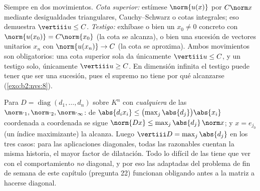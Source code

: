 \begin{method}\label{met:b2:nvs:opnorm}
Siempre en dos movimientos. \emph{Cota superior:} estímese
$\norm{u(x)}$ por $C\norm x$ mediante desigualdades triangulares,
Cauchy--Schwarz o cotas integrales; eso demuestra $\vertiii u \leq
C$. \emph{Testigo:} exhíbase o bien un $x_0 \neq 0$ concreto con
$\norm{u(x_0)} = C\norm{x_0}$ (la cota se alcanza), o bien una
sucesión de vectores unitarios $x_n$ con $\norm{u(x_n)} \to C$ (la
cota se aproxima). Ambos movimientos son obligatorios: una cota
superior sola da únicamente $\vertiii u \leq C$, y un testigo solo,
únicamente $\vertiii u \geq C$. En dimensión infinita el testigo
puede tener que ser una sucesión, pues el supremo no tiene por qué
alcanzarse (\cref{exo:b2:nvs:8}).
\end{method}

\begin{example}\label{ex:b2:nvs:diagonalnorm}
Para $D = \operatorname{diag}(d_1, \dots, d_n)$ sobre $K^n$ con
\emph{cualquiera} de las  $\norm\cdot_1, \norm\cdot_2,
\norm\cdot_\infty$: de $\abs{d_ix_i} \leq
\bigl(\max_j\abs{d_j}\bigr)\abs{x_i}$ coordenada a coordenada se
sigue $\norm{Dx} \leq \max_j\abs{d_j}\,\norm x$; y $x = e_{j_0}$
(un índice maximizante) la alcanza. Luego $\vertiii D =
\max_j\abs{d_j}$ en los tres casos: para las aplicaciones
diagonales, todas las  razonables cuentan la misma
historia, el mayor factor de dilatación. Todo lo difícil de las
 tiene que ver con el comportamiento \emph{no}
diagonal, y por eso las  adaptadas del problema de fin de
semana de este capítulo (pregunta 22) funcionan obligando antes a
la matriz a hacerse diagonal.
\end{example}

